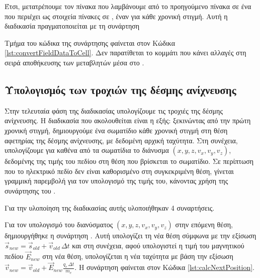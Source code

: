 Έτσι, μετατρέπουμε τον πίνακα που λαμβάνουμε από το προηγούμενο πίνακα σε ένα  που περιέχει ως στοιχεία πίνακες σε , έναν για κάθε χρονική στιγμή. 
Αυτή η διαδικασία πραγματοποιείται με τη συνάρτηση 

Τμήμα του κώδικα της συνάρτησης φαίνεται στον Κώδικα \ref{lst:convertFieldDataToCell}. 
Δεν παρατίθεται το κομμάτι που κάνει αλλαγές στη σειρά αποθήκευσης των μεταβλητών μέσα στο .



\subsection{Υπολογισμός των τροχιών της δέσμης ανίχνευσης}

Στην τελευταία φάση της διαδικασίας υπολογίζουμε τις τροχιές της δέσμης ανίχνευσης.
Η διαδικασία που ακολουθείται είναι η εξής: ξεκινώντας από την πρώτη χρονική στιγμή, δημιουργούμε ένα σωματίδιο κάθε χρονική στιγμή στη θέση αφετηρίας της δέσμης ανίχνευσης, με δεδομένη αρχική ταχύτητα.
Στη συνέχεια, υπολογίζουμε για καθένα από τα σωματίδια το διάνυσμα $\left(x, y, z, v_x, v_y, v_z\right)$, δεδομένης της τιμής  του πεδίου στη θέση που βρίσκεται το σωματίδιο.
Σε περίπτωση που το ηλεκτρικό πεδίο δεν είναι καθορισμένο στη συγκεκριμένη θέση, γίνεται γραμμική παρεμβολή για τον υπολογισμό της τιμής του, κάνοντας χρήση της συνάρτησης του  .

Για την υλοποίηση της διαδικασίας αυτής υλοποιήθηκαν 4 συναρτήσεις.

Για τον υπολογισμό του διανύσματος $\left(x, y, z, v_x, v_y, v_z\right)$ στην επόμενη θέση, δημιουργήθηκε η συνάρτηση .
Αυτή υπολογίζει τη νέα θέση σύμφωνα με την εξίσωση $\vec{s}_{new} = \vec{s}_{old} + \vec{v}_{old}\, \Delta t$ και στη συνέχεια, αφού υπολογιστεί η τιμή του μαγνητικού πεδίου $\vec{E}_{new}$ στη νέα θέση, υπολογίζεται η νέα ταχύτητα με βάση την εξίσωση $\vec{v}_{new} = \vec{v}_{old} + \vec{E}_{new} \frac{q_e \, \Delta t}{m_e}$.
Η συνάρτηση  φαίνεται στον Κώδικα \ref{lst:calcNextPosition}.



